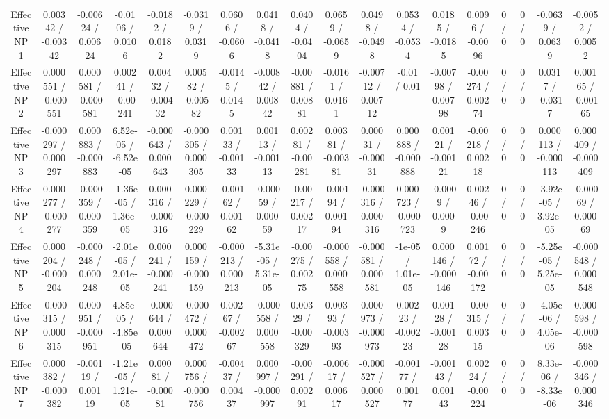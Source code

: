 \documentclass[10pt]{article}
\begin{document}
\begin{table}[htbp]
\begin{center}
\begin{tabular}{|c|c|c|c|c|c|c|c|c|c|c|c|c|c|c|c|c|c|}
  Effective NP 1 & 0.00342 / -0.00342 & -0.00624 / 0.00624 & -0.0106 / 0.0106 & -0.0182 / 0.0182 & -0.0319 / 0.0319 & 0.0606 / -0.0606 & 0.0418 / -0.0418 & 0.0404 / -0.0404 & 0.0659 / -0.0659 & 0.0498 / -0.0498 & 0.0534 / -0.0534 & 0.0185 / -0.0185 & 0.0096 / -0.0096 & 0 / 0 & 0 / 0 & -0.0639 / 0.0639 & -0.0052 / 0.0052 \\ 
  Effective NP 2 & 0.000551 / -0.000551 & 0.000581 / -0.000581 & 0.00241 / -0.00241 & 0.00432 / -0.00432 & 0.00582 / -0.00582 & -0.0145 / 0.0145 & -0.00842 / 0.00842 & -0.00881 / 0.00881 & -0.0161 / 0.0161 & -0.00712 / 0.00712 & -0.01 / 0.01 & -0.00798 / 0.00798 & -0.00274 / 0.00274 & 0 / 0 & 0 / 0 & 0.0317 / -0.0317 & 0.00165 / -0.00165 \\ 
  Effective NP 3 & -0.000297 / 0.000297 & 0.000883 / -0.000883 & 6.52e-05 / -6.52e-05 & -0.000643 / 0.000643 & -0.000305 / 0.000305 & 0.00133 / -0.00133 & 0.00113 / -0.00113 & 0.00281 / -0.00281 & 0.00381 / -0.00381 & 0.00031 / -0.00031 & 0.000888 / -0.000888 & 0.00121 / -0.00121 & -0.00218 / 0.00218 & 0 / 0 & 0 / 0 & 0.000113 / -0.000113 & 0.000409 / -0.000409 \\ 
  Effective NP 4 & 0.000277 / -0.000277 & -0.000359 / 0.000359 & -1.36e-05 / 1.36e-05 & 0.000316 / -0.000316 & 0.000229 / -0.000229 & -0.00162 / 0.00162 & -0.00059 / 0.00059 & -0.00217 / 0.00217 & -0.00194 / 0.00194 & -0.000316 / 0.000316 & 0.000723 / -0.000723 & -0.0009 / 0.0009 & 0.00246 / -0.00246 & 0 / 0 & 0 / 0 & -3.92e-05 / 3.92e-05 & -0.00069 / 0.00069 \\ 
  Effective NP 5 & 0.000204 / -0.000204 & -0.000248 / 0.000248 & -2.01e-05 / 2.01e-05 & 0.000241 / -0.000241 & 0.000159 / -0.000159 & -0.000213 / 0.000213 & -5.31e-05 / 5.31e-05 & -0.00275 / 0.00275 & -0.000558 / 0.000558 & -0.000581 / 0.000581 & -1e-05 / 1.01e-05 & 0.000146 / -0.000146 & 0.00172 / -0.00172 & 0 / 0 & 0 / 0 & -5.25e-05 / 5.25e-05 & -0.000548 / 0.000548 \\ 
  Effective NP 6 & -0.000315 / 0.000315 & 0.000951 / -0.000951 & 4.85e-05 / -4.85e-05 & -0.000644 / 0.000644 & -0.000472 / 0.000472 & 0.00267 / -0.00267 & -0.000558 / 0.000558 & 0.00329 / -0.00329 & 0.00393 / -0.00393 & 0.000973 / -0.000973 & 0.00223 / -0.00223 & 0.00128 / -0.00128 & -0.00315 / 0.00315 & 0 / 0 & 0 / 0 & -4.05e-06 / 4.05e-06 & 0.000598 / -0.000598 \\ 
  Effective NP 7 & 0.000382 / -0.000382 & -0.00119 / 0.00119 & -1.21e-05 / 1.21e-05 & 0.00081 / -0.00081 & 0.000756 / -0.000756 & -0.00437 / 0.00437 & 0.000997 / -0.000997 & -0.00291 / 0.00291 & -0.00617 / 0.00617 & -0.000527 / 0.000527 & -0.00177 / 0.00177 & -0.00143 / 0.00143 & 0.00224 / -0.00224 & 0 / 0 & 0 / 0 & 8.33e-06 / -8.33e-06 & -0.000346 / 0.000346 \\ 

\end{tabular}
\end{center}
\end{table}
\end{document}
